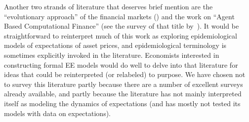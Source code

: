 Another two strands of literature that deserves brief mention are the ``evolutionary approach'' of the financial markets (\cite{lo2004adaptive,brennan2011origin}) and the work on ``Agent Based Computational Finance'' (see the survey of that title by~\cite{lebaronAgentCompFinance}).  It would be straightforward to reinterpret much of this work as exploring epidemiological models of expectations of asset prices, and epidemiological terminology is sometimes explicitly invoked in the literature.   Economists interested in constructing formal EE models would do well to delve into that literature for ideas that could be reinterpreted (or relabeled) to purpose.  We have chosen not to survey this literature partly because there are a number of excellent surveys already available, and partly because the literature has not mainly interpreted itself as modeling the dynamics of expectations (and has mostly not tested its models with data on expectations).